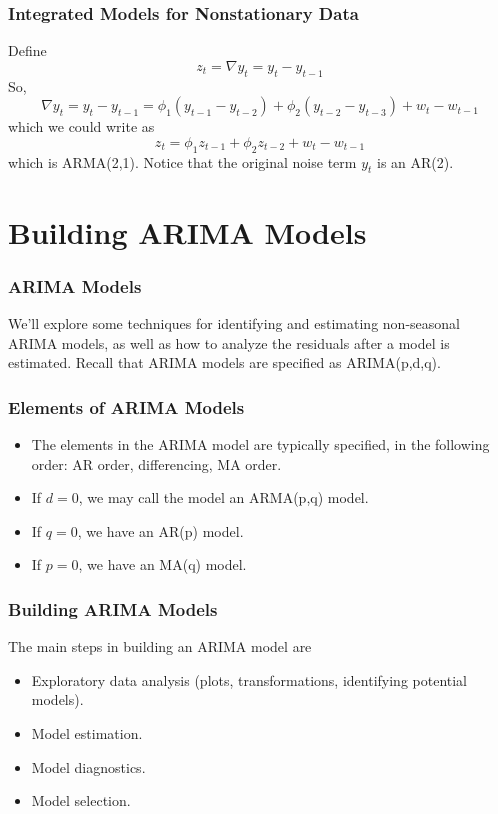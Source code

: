 \documentclass[%
xcolor=pdftex]{beamer}
\begin{document}
\begin{frame}
\frametitle{Integrated Models for Nonstationary Data}

Define
$$
z_t=\nabla y_t=y_t-y_{t-1}
$$
So,
$$
\nabla y_t=y_t-y_{t-1}=\phi_1 (y_{t-1}-y_{t-2})+\phi_2 (y_{t-2}-y_{t-3})+w_t-w_{t-1}
$$
which we could write as
$$
z_t=\phi_1 z_{t-1}+\phi_2 z_{t-2}+w_t-w_{t-1}
$$
which is ARMA(2,1). Notice that the original noise term $y_t$
is an AR(2).

\end{frame}

\section{Building ARIMA Models}
\frame{\tableofcontents[currentsection]}

\begin{frame}
\frametitle{ARIMA Models}

We'll explore some techniques for identifying and estimating non-seasonal ARIMA models, as well as how to analyze the residuals after a model is estimated. Recall that ARIMA models are specified as ARIMA(p,d,q).

\end{frame}

\begin{frame}
\frametitle{Elements of ARIMA Models}

\begin{itemize}
\item The elements in the ARIMA model are typically specified, in the following order: AR order, differencing, MA order.
\item If $d=0$, we may call the model an ARMA(p,q) model.
\item If $q=0$, we have an AR(p) model.
\item If $p=0$, we have an MA(q) model.
\end{itemize}

\end{frame}

\begin{frame}
\frametitle{Building ARIMA Models}

The main steps in building an ARIMA model are

\begin{itemize}
\item Exploratory data analysis (plots, transformations, identifying potential models).
\item Model estimation.
\item Model diagnostics.
\item Model selection.
\end{itemize}

\end{frame}
\end{document}
